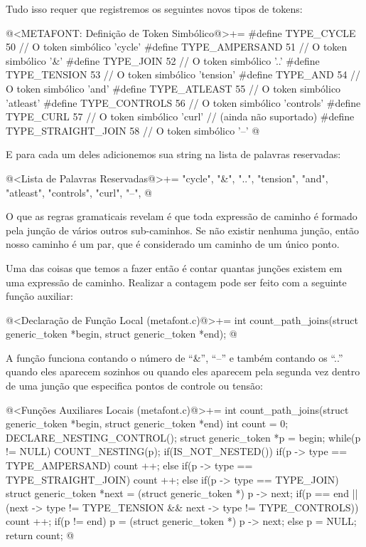 Tudo isso requer que registremos os seguintes novos tipos de tokens:

\iniciocodigo
@<METAFONT: Definição de Token Simbólico@>+=
#define TYPE_CYCLE          50 // O token simbólico 'cycle'
#define TYPE_AMPERSAND      51 // O token simbólico '&'
#define TYPE_JOIN           52 // O token simbólico '..'
#define TYPE_TENSION        53 // O token simbólico 'tension'
#define TYPE_AND            54 // O token simbólico 'and'
#define TYPE_ATLEAST        55 // O token simbólico 'atleast'
#define TYPE_CONTROLS       56 // O token simbólico 'controls'
#define TYPE_CURL           57 // O token simbólico 'curl'
                               // (ainda não suportado)
#define TYPE_STRAIGHT_JOIN  58 // O token simbólico '--'
@
\fimcodigo

E para cada um deles adicionemos sua string na lista de palavras
reservadas:

\iniciocodigo
@<Lista de Palavras Reservadas@>+=
"cycle", "&", "..", "tension", "and", "atleast", "controls", "curl", "--",
@
\fimcodigo

O que as regras gramaticais revelam é que toda expressão de caminho é
formado pela junção de vários outros sub-caminhos. Se não existir
nenhuma junção, então nosso caminho é um par, que é considerado um
caminho de um único ponto.

Uma das coisas que temos a fazer então é contar quantas junções
existem em uma expressão de caminho. Realizar a contagem pode ser
feito com a seguinte função auxiliar:

\iniciocodigo
@<Declaração de Função Local (metafont.c)@>+=
int count_path_joins(struct generic_token *begin, struct generic_token *end);
@
\fimcodigo

A função funciona contando o número de ``\&'', ``--'' e também contando os
``..'' quando eles aparecem sozinhos ou quando eles aparecem pela
segunda vez dentro de uma junção que especifica pontos de controle ou
tensão:

\iniciocodigo
@<Funções Auxiliares Locais (metafont.c)@>+=
int count_path_joins(struct generic_token *begin, struct generic_token *end){
  int count = 0;
  DECLARE_NESTING_CONTROL();
  struct generic_token *p = begin;
  while(p != NULL){
    COUNT_NESTING(p);
    if(IS_NOT_NESTED()){
      if(p -> type == TYPE_AMPERSAND)
        count ++;
      else if(p -> type == TYPE_STRAIGHT_JOIN)
        count ++;
      else if(p -> type == TYPE_JOIN){
        struct generic_token *next = (struct generic_token *) p -> next;
        if(p == end || (next -> type !=  TYPE_TENSION &&
                        next -> type != TYPE_CONTROLS))
          count ++;
      }
    }
    if(p != end)
      p = (struct generic_token *) p -> next;
    else
      p = NULL;
  }
  return count;
}
@
\fimcodigo

